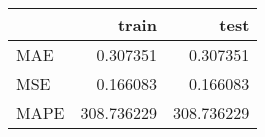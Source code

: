 \begin{tabular}{lrr}
\toprule
{} &       train &        test \\
\midrule
MAE  &    0.307351 &    0.307351 \\
MSE  &    0.166083 &    0.166083 \\
MAPE &  308.736229 &  308.736229 \\
\bottomrule
\end{tabular}
